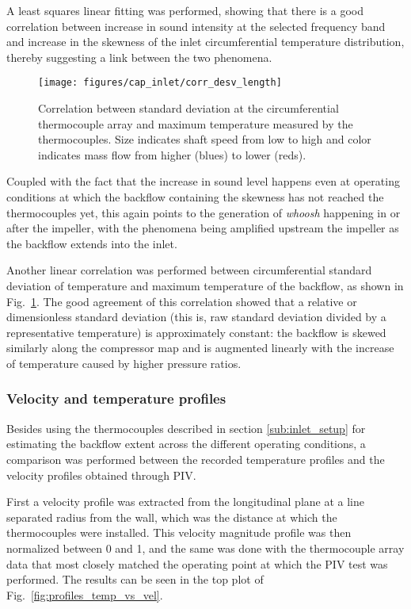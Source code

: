 A least squares linear fitting was performed, showing that there is a good correlation between increase in sound intensity at the selected frequency band and increase in the skewness of the inlet circumferential temperature distribution, thereby suggesting a link between the two phenomena.

\begin{figure}[htb!]
\centering
\texttt{[image: figures/cap\_inlet/corr\_desv\_length]}
\caption[Correlation between $\sigma$ temp. and backflow length]{Correlation between standard deviation at the circumferential thermocouple array and maximum temperature measured by the thermocouples. Size indicates shaft speed from low to high and color indicates mass flow from higher (blues) to lower (reds).}
\label{fig:corr2}
\end{figure}

Coupled with the fact that the increase in sound level happens even at operating conditions at which the backflow containing the skewness has not reached the thermocouples yet, this again points to the generation of \emph{whoosh} happening in or after the impeller, with the phenomena being amplified upstream the impeller as the backflow extends into the inlet.

Another linear correlation was performed between circumferential standard deviation of temperature and maximum temperature of the backflow, as shown in Fig.~\ref{fig:corr2}. The good agreement of this correlation showed that a relative or dimensionless standard deviation (this is, raw standard deviation divided by a representative temperature) is approximately constant: the backflow is skewed similarly along the compressor map and is augmented linearly with the increase of temperature caused by higher pressure ratios.

\subsubsection{Velocity and temperature profiles}

Besides using the thermocouples described in section \ref{sub:inlet_setup} for estimating the backflow extent across the different operating conditions, a comparison was performed between the recorded temperature profiles and the velocity profiles obtained through PIV.

First a velocity profile was extracted from the longitudinal plane at a line  separated  radius from the wall, which was the distance at which the thermocouples were installed. This velocity magnitude profile was then normalized between 0 and 1, and the same was done with the thermocouple array data that most closely matched the operating point at which the PIV test was performed. The results can be seen in the top plot of Fig.~\ref{fig:profiles_temp_vs_vel}.

